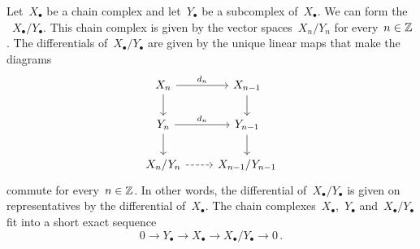 \begin{recall}
	Let~$X_\bullet$ be a chain complex and let~$Y_\bullet$ be a subcomplex of~$X_\bullet$.
	We can form the ~$X_\bullet / Y_\bullet$.
	This chain complex is given by the vector spaces~$X_n / Y_n$ for every~$n \in \mathbb{Z}$.
	The differentials of~$X_\bullet / Y_\bullet$ are given by the unique linear maps that make the diagrams
	\[
		\begin{tikzcd}
			X_n
			\arrow{d}
			\arrow{r}[above]{d_n}
			&
			X_{n-1}
			\arrow{d}
			\\
			Y_n
			\arrow{r}[above]{d_n}
			\arrow{d}
			&
			Y_{n-1}
			\arrow{d}
			\\
			X_n / Y_n
			\arrow[dashed]{r}
			&
			X_{n-1} / Y_{n-1}
		\end{tikzcd}
	\]
	commute for every~$n \in \mathbb{Z}$.
	In other words, the differential of~$X_\bullet / Y_\bullet$ is given on representatives by the differential of~$X_\bullet$.
	The chain complexes~$X_\bullet$,~$Y_\bullet$ and~$X_\bullet / Y_\bullet$ fit into a short exact sequence
	\[
		0
		\to
		Y_\bullet
		\to
		X_\bullet
		\to
		X_\bullet / Y_\bullet
		\to
		0 \,.
	\]
\end{recall}


